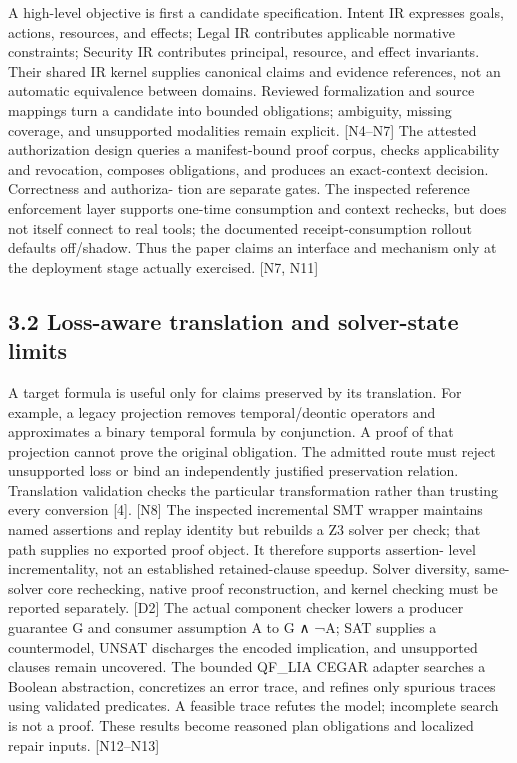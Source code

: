 \documentclass{article}
\begin{document}
A high-level objective is first a candidate specification. Intent IR expresses goals, actions, resources,
and effects; Legal IR contributes applicable normative constraints; Security IR contributes principal,
resource, and effect invariants. Their shared IR kernel supplies canonical claims and evidence
references, not an automatic equivalence between domains. Reviewed formalization and source
mappings turn a candidate into bounded obligations; ambiguity, missing coverage, and unsupported
modalities remain explicit. [N4–N7]
The attested authorization design queries a manifest-bound proof corpus, checks applicability and
revocation, composes obligations, and produces an exact-context decision. Correctness and authoriza-
tion are separate gates. The inspected reference enforcement layer supports one-time consumption
and context rechecks, but does not itself connect to real tools; the documented receipt-consumption
rollout defaults off/shadow. Thus the paper claims an interface and mechanism only at the deployment
stage actually exercised. [N7, N11]


\subsection*{3.2 Loss-aware translation and solver-state limits}

A target formula is useful only for claims preserved by its translation. For example, a legacy projection
removes temporal/deontic operators and approximates a binary temporal formula by conjunction.
A proof of that projection cannot prove the original obligation. The admitted route must reject
unsupported loss or bind an independently justified preservation relation. Translation validation
checks the particular transformation rather than trusting every conversion [4]. [N8]
The inspected incremental SMT wrapper maintains named assertions and replay identity but rebuilds
a Z3 solver per check; that path supplies no exported proof object. It therefore supports assertion-
level incrementality, not an established retained-clause speedup. Solver diversity, same-solver core
rechecking, native proof reconstruction, and kernel checking must be reported separately. [D2]
The actual component checker lowers a producer guarantee G and consumer assumption A to G ∧
¬A; SAT supplies a countermodel, UNSAT discharges the encoded implication, and unsupported
clauses remain uncovered. The bounded QF\_LIA CEGAR adapter searches a Boolean abstraction,
concretizes an error trace, and refines only spurious traces using validated predicates. A feasible trace
refutes the model; incomplete search is not a proof. These results become reasoned plan obligations
and localized repair inputs. [N12–N13]
\end{document}
